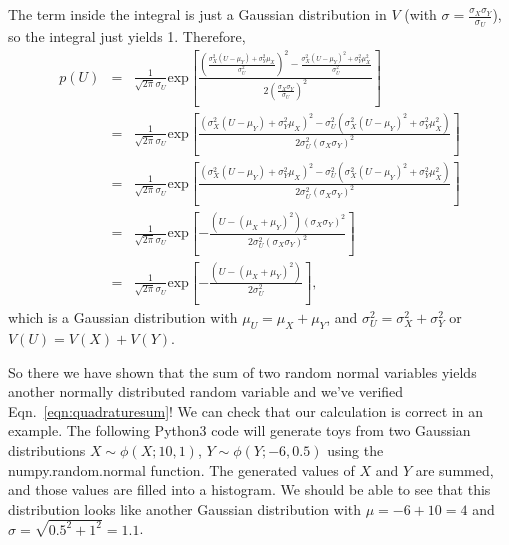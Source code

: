 \begin{tcolorbox}[colback=backblue]
The term inside the integral is just a Gaussian distribution in $V$ (with $\sigma=\frac{\sigma_{X}\sigma_{Y}}{\sigma_{U}}$), so the integral just yields 1. Therefore, 
\begin{eqnarray}
p(U) & = & \frac{1}{\sqrt{2\pi}\sigma_{U}}\mathrm{exp}\left[\frac{ \left(\frac{\sigma_{X}^{2}(U-\mu_{Y})+\sigma_{Y}^{2}\mu_{X}}{\sigma_{U}^{2}}\right)^{2} 
    - \frac{\sigma_{X}^{2}(U-\mu_{Y})^{2}+\sigma_{Y}^{2}\mu_{X}^{2}}{\sigma_{U}^{2}}}
    {2\left(\frac{\sigma_{X} \sigma_{Y}}{\sigma_{U}}\right)^{2}} \right]\\
    & = & 
    \frac{1}{\sqrt{2\pi}\sigma_{U}}\mathrm{exp}\left[\frac{ \left({\sigma_{X}^{2}(U-\mu_{Y})+\sigma_{Y}^{2}\mu_{X}}\right)^{2} 
    - \sigma_{U}^{2}\left({\sigma_{X}^{2}(U-\mu_{Y})^{2}+\sigma_{Y}^{2}\mu_{X}^{2}}\right)}
    {2\sigma_{U}^{2}\left({\sigma_{X} \sigma_{Y}}\right)^{2}} \right]\\
    & = & 
    \frac{1}{\sqrt{2\pi}\sigma_{U}}\mathrm{exp}\left[\frac{ \left({\sigma_{X}^{2}(U-\mu_{Y})+\sigma_{Y}^{2}\mu_{X}}\right)^{2} 
    - \sigma_{U}^{2}\left({\sigma_{X}^{2}(U-\mu_{Y})^{2}+\sigma_{Y}^{2}\mu_{X}^{2}}\right)}
    {2\sigma_{U}^{2}\left({\sigma_{X} \sigma_{Y}}\right)^{2}} \right]\\
    & = & 
    \frac{1}{\sqrt{2\pi}\sigma_{U}}\mathrm{exp}\left[-\frac{ (U-(\mu_{X}+\mu_{Y})^{2})(\sigma_{X}\sigma_{Y})^{2}}
    {2\sigma_{U}^{2}\left({\sigma_{X} \sigma_{Y}}\right)^{2}} \right]\\
     & = & 
    \frac{1}{\sqrt{2\pi}\sigma_{U}}\mathrm{exp}\left[-\frac{ (U-(\mu_{X}+\mu_{Y})^{2})}
    {2\sigma_{U}^{2}} \right],
\end{eqnarray}
which is a Gaussian distribution with $\mu_{U}=\mu_{X}+\mu_{Y}$, and $\sigma_{U}^{2}=\sigma_{X}^{2}+\sigma_{Y}^{2}$ or $V(U)=V(X)+V(Y)$.
\end{tcolorbox}

So there we have shown that the sum of two random normal variables yields another normally distributed random variable and we've verified Eqn.~\ref{eqn:quadraturesum}! We can check that our calculation is correct in an example. The following \textsf{Python3} code will generate toys from two Gaussian distributions $X\sim\phi(X;10,1)$, $Y\sim\phi(Y;-6,0.5)$ using the \textsf{numpy.random.normal} function. The generated values of $X$ and $Y$ are summed, and those values are filled into a histogram. We should be able to see that this distribution looks like another Gaussian distribution with $\mu=-6+10=4$ and $\sigma=\sqrt{0.5^2+1^2}=1.1$. 

